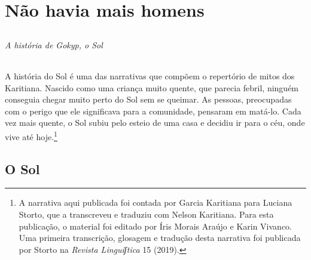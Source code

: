 \part{Não havia mais homens}

\chapter*{}
\thispagestyle{empty}

\vspace*{\fill}
\paragraph{A história de Gokyp, o Sol} A história do Sol é uma das narrativas que compõem o repertório de mitos dos Karitiana. Nascido como uma criança muito quente, que parecia febril, ninguém conseguia chegar muito perto do Sol sem se queimar. As
pessoas, preocupadas com o perigo que ele significava para a comunidade,
pensaram em matá-lo. Cada vez mais quente, o Sol subiu pelo esteio de
uma casa e decidiu ir para o céu, onde vive até hoje.\footnote{A narrativa aqui publicada foi contada por Garcia Karitiana para Luciana Storto, que a transcreveu e traduziu com Nelson Karitiana. Para esta
publicação, o material foi editado por Íris Morais Araújo e Karin
Vivanco. Uma primeira transcrição, glosagem e tradução desta narrativa foi publicada por Storto na \textit{Revista Linguíʃtica} 15 (2019).}
\vspace*{\fill}

\chapter{O Sol}

